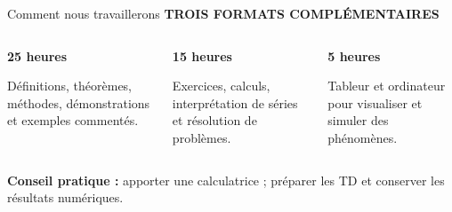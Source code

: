 \documentclass[aspectratio=169,10pt]{beamer}
\newcommand{\meta}[1]{{\small\bfseries\color{turquoise} #1}\par\vspace{0.07cm}}
\begin{document}
\begin{frame}{Comment nous travaillerons}
\meta{TROIS FORMATS COMPLÉMENTAIRES}
\begin{columns}[T,onlytextwidth]
\begin{tcolorbox}[colback=pale,colframe=pale,height=3.07cm]
\par
{\bfseries\color{nuit}25 heures}\par\vspace{0.18cm}
\small Définitions, théorèmes, méthodes, démonstrations et exemples commentés.
\end{tcolorbox}
\begin{tcolorbox}[colback=palevert,colframe=palevert,height=3.07cm]
\par
{\bfseries\color{nuit}15 heures}\par\vspace{0.18cm}
\small Exercices, calculs, interprétation de séries et résolution de problèmes.
\end{tcolorbox}
\begin{tcolorbox}[colback=paleorange,colframe=paleorange,height=3.07cm]
\par
{\bfseries\color{nuit}5 heures}\par\vspace{0.18cm}
\small Tableur et ordinateur pour visualiser et simuler des phénomènes.
\end{tcolorbox}
\end{columns}
\vspace{0.27cm}
\begin{center}{\small\color{gris}\textbf{Conseil pratique :} apporter une calculatrice ; préparer les TD et conserver les résultats numériques.}\end{center}
\end{frame}
\end{document}
